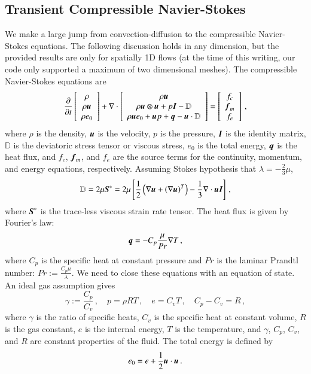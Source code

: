 \documentclass[preprint,12pt]{elsarticle}
\begin{document}
\subsection{Transient Compressible Navier-Stokes}
We make a large jump from convection-diffusion to the compressible Navier-Stokes equations.
The following discussion holds in any dimension, but the provided results are only for spatially 1D flows 
(at the time of this writing, our code only supported a maximum of two dimensional meshes).
The compressible Navier-Stokes equations are
\begin{align}
\frac{\partial}{\partial t}\left[ \begin{array}{c} \rho\\ \rho\boldsymbol u\\ \rho e_0\\ \end{array} \right]
+\nabla\cdot\left[ \begin{array}{c} \rho\boldsymbol u\\ \rho\boldsymbol u\otimes\boldsymbol u+p\boldsymbol I-\mathbb{D}\\ \rho\boldsymbol u e_0+\boldsymbol u p+\boldsymbol q-\boldsymbol u\cdot\mathbb{D}\\ \end{array} \right]
=\left[ \begin{array}{c} f_c\\ \boldsymbol f_m\\ f_e\\ \end{array} \right]\,,
\end{align}
where $\rho$ is the density, $\boldsymbol u$ is the velocity, $p$ is the pressure, $\boldsymbol I$ is the identity matrix,
$\mathbb{D}$ is the deviatoric stress tensor or viscous stress, $e_0$ is the total energy, $\boldsymbol q$ is the heat flux, 
and $f_c$, $\boldsymbol f_m$, and $f_e$ are the source terms for the continuity, momentum, and energy equations, respectively.
Assuming Stokes hypothesis that $\lambda=-\frac{2}{3}\mu$, 
\begin{equation*}
	\mathbb{D}=2\mu\boldsymbol S^*=2\mu\left[ \frac{1}{2}\left( \nabla\boldsymbol u+\left( \nabla\boldsymbol u \right)^T \right)-\frac{1}{3}\nabla\cdot\boldsymbol u\boldsymbol I \right]\,,
\end{equation*}
where $\boldsymbol S^*$ is the trace-less viscous strain rate tensor.
The heat flux is given by Fourier's law:
\begin{equation*}
	\boldsymbol q=-C_p\frac{\mu}{Pr}\nabla T\,,
\end{equation*}
where $C_p$ is the specific heat at constant pressure and $Pr$ is the laminar Prandtl number: $Pr:=\frac{C_p\mu}{\lambda}$.
We need to close these equations with an equation of state. An ideal gas assumption gives
\begin{equation*}
	\gamma:=\frac{C_p}{C_v}\,,\quad p=\rho RT\,,\quad e=C_v T\,,\quad C_p-C_v=R\,,
\end{equation*}
where $\gamma$ is the ratio of specific heats, $C_v$ is the specific heat at constant volume, $R$ is the gas constant,
$e$ is the internal energy, $T$ is the temperature,
and $\gamma$, $C_p$, $C_v$, and $R$ are constant properties of the fluid.
The total energy is defined by
\begin{equation*}
	e_0=e+\frac{1}{2}\boldsymbol u\cdot\boldsymbol u\,.
\end{equation*}
\end{document}
